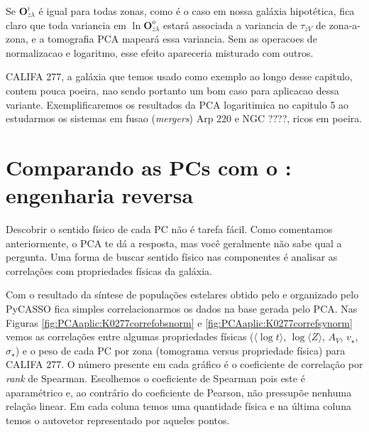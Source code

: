 Se $\textbf{O}^i_{z \lambda}$ é igual para todas zonas, como é o caso em nossa galáxia hipotética, fica claro que toda variancia em 
$\ln \textbf{O}^o_{z \lambda}$ estará associada a variancia de $\tau_{z V}$ de zona-a-zona, e a tomografia PCA mapeará essa variancia. 
Sem as operacoes de normalizacao e logaritmo, esse efeito apareceria misturado com outros. 

CALIFA 277, a galáxia que temos usado como exemplo ao longo desse capitulo, contem pouca poeira, nao sendo portanto um bom caso para aplicacao dessa variante. Exemplificaremos os resultados da PCA logaritimica no capitulo 5 ao estudarmos os sistemas em fusao ({\em mergers}) Arp 220 e NGC ????, ricos em poeira.



\section{Comparando as PCs com o \STARLIGHT: engenharia reversa}
\label{sec:PCAaplic:EngRev}

Descobrir o sentido físico de cada PC não é tarefa fácil. Como comentamos anteriormente, o PCA te dá a resposta, mas
você geralmente não sabe qual a pergunta. Uma forma de buscar sentido físico nas componentes é analisar as correlações
com propriedades físicas da galáxia. 

Com o resultado da síntese de populações estelares obtido pelo \starlight e
organizado pelo PyCASSO fica simples correlacionarmos os dados na base gerada pelo PCA. Nas Figuras
\ref{fig:PCAaplic:K0277correfobsnorm} e \ref{fig:PCAaplic:K0277correfsynorm} vemos as correlações entre algumas propriedades 
físicas ($\langle\log t \rangle$, $\log \langle Z \rangle$, $A_V$, $v_{\star}$, $\sigma_{\star}$) e o peso de cada PC por zona (tomograma
versus propriedade física) para CALIFA 277. O número presente em cada gráfico é o coeficiente de correlação por
{\em rank} de Spearman. Escolhemos o coeficiente de Spearman pois este é aparamétrico e, ao contrário do coeficiente de
Pearson, não pressupõe nenhuma relação linear. Em cada coluna temos uma quantidade física e na última coluna temos o autovetor representado por aqueles pontos.

